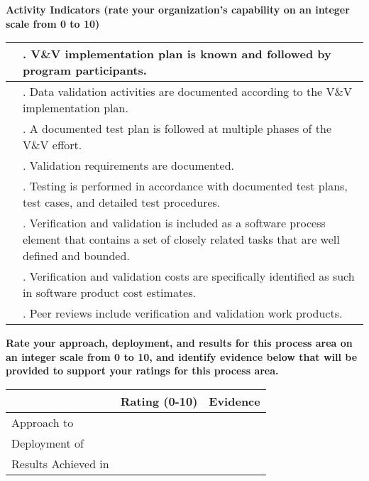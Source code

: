 \documentclass{article}
\newcommand{\KPAname}{}
\newenvironment{KPARate}[1]
	{\renewcommand{\KPAname}{#1}
	 {\bf Rate your approach, deployment, and results for
	  this process area on an integer scale from 0 to 10, and 
	  identify evidence below that will be provided to support your
	  ratings for this process area.}
	 \begin{center}
	 \begin{tabular}{|p{1.0in}|p{0.5in}|p{5.0in}|} \hline
	 & Rating (0-10) & \multicolumn{1}{c|}{Evidence} \\ \hline}
	{\end{tabular}
	 \end{center}}
\newcommand{\Approach}[2]{Approach to \KPAname & #1 & #2 \\ \hline}
\newcommand{\Deployment}[2]{Deployment of \KPAname & #1 & #2 \\ \hline}
\newcommand{\Results}[2]{Results Achieved in \KPAname & #1 & #2 \\
	\hline}
\newcounter{activity}
\newenvironment{KPAActivity}
	{
	 \setcounter{activity}{0}
	 {\bf Activity Indicators (rate your organization's capability
	 on an integer scale from 0 to 10)}
	 \begin{center}
	 \begin{tabular}{|p{0.5in}|p{6.0in}|} \hline
	}
	{
	 \end{tabular}
	 \end{center}
	}
\newcommand{\Activity}[2]{\stepcounter{activity} #1 &
\arabic{activity}. #2 \\ \hline}
\begin{document}
\begin{KPAActivity}
\Activity{}{V\&V implementation plan is known and followed by program
participants.}
\Activity{}{Data validation activities are documented according to the
V\&V implementation plan.}
\Activity{}{A documented test plan is followed at multiple phases of the
V\&V effort.}
\Activity{}{Validation requirements are documented.}
\Activity{}{Testing is performed in accordance with documented test
plans, test cases, and detailed test procedures.}
\Activity{}{Verification and validation is included as a software
process element that contains a set of closely related tasks that are
well defined and bounded.}
\Activity{}{Verification and validation costs are specifically
identified as such in software product cost estimates.}
\Activity{}{Peer reviews include verification and validation work
products.}
\end{KPAActivity}

\begin{KPARate}{Validation and Verification}
\Approach{}{}
\Deployment{}{}
\Results{}{}
\end{KPARate}
\end{document}
